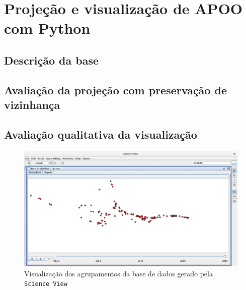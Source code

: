 		
			
		
		
	\section{Projeção e visualização de APOO com Python}
	
	\subsection{Descrição da base}
	
	\subsection{Avaliação da projeção com preservação de vizinhança}
	
	
	\subsection{Avaliação qualitativa da visualização}
	
	
		\begin{figure}[h]
			\centering
			\includegraphics[width=1\linewidth]{imagem/projecaoFinal} %
			\caption[Visualização dos agrupamentos da base de dados gerado pela \texttt{Science View}]
			{Visualização dos agrupamentos da base de dados gerado pela \texttt{Science View} \cite{Alencar-etal:2012}}
			\label{fig:projecaoFinal}
		\end{figure}
		
